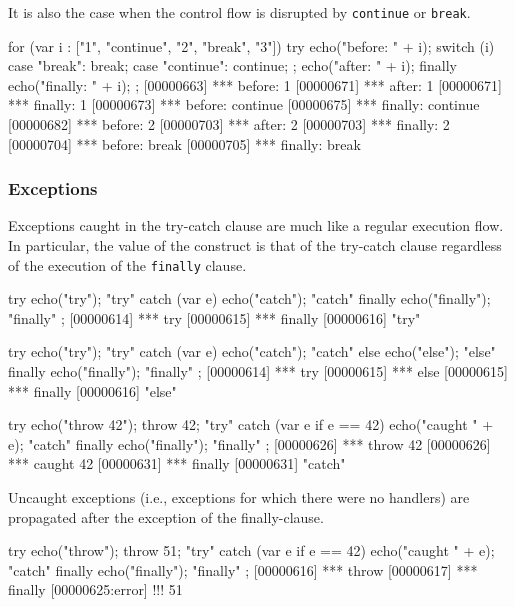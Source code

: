 It is also the case when the control flow is disrupted by
\lstinline{continue} or \lstinline{break}.

\begin{urbiscript}
for (var i : ["1", "continue", "2", "break", "3"])
  try
  {
    echo("before:  " + i);
    switch (i)
    {
      case "break":    break;
      case "continue": continue;
    };
    echo("after:   " + i);
  }
  finally
  {
    echo("finally: " + i);
  };
[00000663] *** before:  1
[00000671] *** after:   1
[00000671] *** finally: 1
[00000673] *** before:  continue
[00000675] *** finally: continue
[00000682] *** before:  2
[00000703] *** after:   2
[00000703] *** finally: 2
[00000704] *** before:  break
[00000705] *** finally: break
\end{urbiscript}


\subsubsection{Exceptions}

Exceptions caught in the try-catch clause are much like a regular execution
flow.  In particular, the value of the construct is that of the try-catch
clause regardless of the execution of the \lstinline{finally} clause.

\begin{urbiscript}
try           { echo("try");     "try" }
catch (var e) { echo("catch");   "catch" }
finally       { echo("finally"); "finally" };
[00000614] *** try
[00000615] *** finally
[00000616] "try"

try           { echo("try");     "try" }
catch (var e) { echo("catch");   "catch" }
else          { echo("else");    "else" }
finally       { echo("finally"); "finally" };
[00000614] *** try
[00000615] *** else
[00000615] *** finally
[00000616] "else"

try                      { echo("throw 42"); throw 42; "try" }
catch (var e if e == 42) { echo("caught " + e);        "catch" }
finally                  { echo("finally");            "finally" };
[00000626] *** throw 42
[00000626] *** caught 42
[00000631] *** finally
[00000631] "catch"
\end{urbiscript}


Uncaught exceptions (i.e., exceptions for which there were no handlers) are
propagated after the exception of the finally-clause.

\begin{urbiscript}
try                      { echo("throw"); throw 51; "try" }
catch (var e if e == 42) { echo("caught " + e);     "catch" }
finally                  { echo("finally");         "finally" };
[00000616] *** throw
[00000617] *** finally
[00000625:error] !!! 51
\end{urbiscript}

